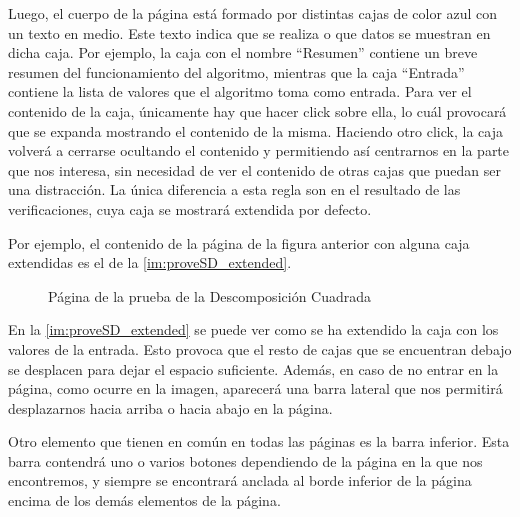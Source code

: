 Luego, el cuerpo de la página está formado por distintas cajas de color azul con un texto en medio. Este texto indica que se realiza o que datos se muestran en dicha caja. Por ejemplo, la caja con el nombre ``Resumen'' contiene un breve resumen del funcionamiento del algoritmo, mientras que la caja ``Entrada'' contiene la lista de valores que el algoritmo toma como entrada. Para ver el contenido de la caja, únicamente hay que hacer click sobre ella, lo cuál provocará que se expanda mostrando el contenido de la misma. Haciendo otro click, la caja volverá a cerrarse ocultando el contenido y permitiendo así centrarnos en la parte que nos interesa, sin necesidad de ver el contenido de otras cajas que puedan ser una distracción. La única diferencia a esta regla son en el resultado de las verificaciones, cuya caja se mostrará extendida por defecto.

Por ejemplo, el contenido de la página de la figura anterior con alguna caja extendidas es el de la \autoref{im:proveSD_extended}.
\begin{figure}[H]
    \centering
    \caption{Página de la prueba de la Descomposición Cuadrada}
    \label{im:proveSD_extended}
\end{figure}
En la \autoref{im:proveSD_extended} se puede ver como se ha extendido la caja con los valores de la entrada. Esto provoca que el resto de cajas que se encuentran debajo se desplacen para dejar el espacio suficiente. Además, en caso de no entrar en la página, como ocurre en la imagen, aparecerá una barra lateral que nos permitirá desplazarnos hacia arriba o hacia abajo en la página.

Otro elemento que tienen en común en todas las páginas es la barra inferior. Esta barra contendrá uno o varios botones dependiendo de la página en la que nos encontremos, y siempre se encontrará anclada al borde inferior de la página encima de los demás elementos de la página.

